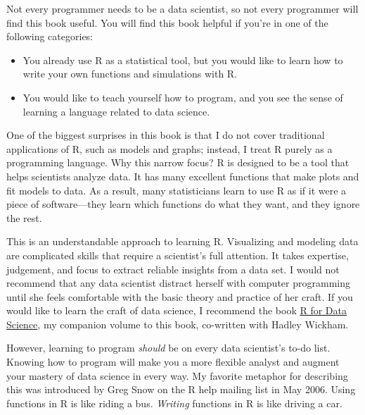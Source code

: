 \documentclass[
  letterpaper,
  DIV=11,
  numbers=noendperiod]{scrbook}
\begin{document}
Not every programmer needs to be a data scientist, so not every
programmer will find this book useful. You will find this book helpful
if you're in one of the following categories:

\begin{itemize}
\item
  You already use R as a statistical tool, but you would like to learn
  how to write your own functions and simulations with R.
\item
  You would like to teach yourself how to program, and you see the sense
  of learning a language related to data science.
\end{itemize}

One of the biggest surprises in this book is that I do not cover
traditional applications of R, such as models and graphs; instead, I
treat R purely as a programming language. Why this narrow focus? R is
designed to be a tool that helps scientists analyze data. It has many
excellent functions that make plots and fit models to data. As a result,
many statisticians learn to use R as if it were a piece of
software---they learn which functions do what they want, and they ignore
the rest.

This is an understandable approach to learning R. Visualizing and
modeling data are complicated skills that require a scientist's full
attention. It takes expertise, judgement, and focus to extract reliable
insights from a data set. I would not recommend that any data scientist
distract herself with computer programming until she feels comfortable
with the basic theory and practice of her craft. If you would like to
learn the craft of data science, I recommend the book
\href{http://r4ds.had.co.nz/}{R for Data Science}, my companion volume
to this book, co-written with Hadley Wickham.

However, learning to program \emph{should} be on every data scientist's
to-do list. Knowing how to program will make you a more flexible analyst
and augment your mastery of data science in every way. My favorite
metaphor for describing this was introduced by Greg Snow on the R help
mailing list in May 2006. Using functions in R is like riding a bus.
\emph{Writing} functions in R is like driving a car.
\end{document}

